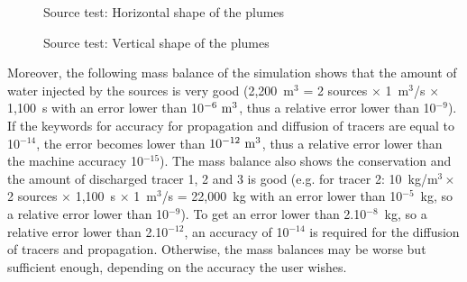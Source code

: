 \begin{figure} [H]
\centering
{}
 \caption{Source test: Horizontal shape of the plumes}
 \label{t3d:source:hor_shape}
\end{figure}

\begin{figure} [H]
\centering
{}
 \caption{Source test: Vertical shape of the plumes}
 \label{t3d:source:ver_shape}
\end{figure}

Moreover, the following mass balance of the  simulation
shows that the amount of water injected by the sources is very good
(2,200~m$^3$ = 2 sources $\times$ 1~m$^3$/s $\times$ 1,100~s
with an error lower than 10$^{-6}~\rm{m}^3$, thus a relative error
lower than 10$^{-9}$).
If the keywords for accuracy for propagation and diffusion of tracers
are equal to 10$^{-14}$, the error becomes lower than
$10^{-12}~\rm{m}^3$, thus a relative error lower than the machine
accuracy 10$^{-15}$).
The mass balance also shows the conservation and the amount of
discharged tracer 1, 2 and 3 is good
(e.g. for tracer 2: 10~kg/m$^3 \times$ 2 sources $\times$ 1,100~s
$\times$ 1~m$^3$/s = 22,000~kg with an error lower than 10$^{-5}$~kg,
so a relative error lower than 10$^{-9}$).
To get an error lower than 2.10$^{-8}$~kg, so a relative error lower
than 2.10$^{-12}$, an accuracy of 10$^{-14}$ is required for the
diffusion of tracers and propagation.
Otherwise, the mass balances may be worse but sufficient enough,
depending on the accuracy the user wishes.

